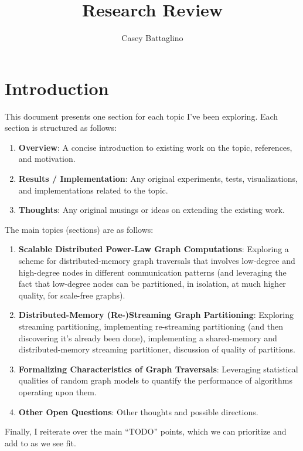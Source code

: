 \documentclass[11pt]{article}
\title{Research Review}
\author{Casey Battaglino}
\begin{document}
\maketitle


\section{Introduction}

This document presents one section for each topic I've been exploring. Each section is structured as follows:
\begin{enumerate}
\item \textbf{Overview}: A concise introduction to existing work on the topic, references, and motivation.
\item \textbf{Results / Implementation}: Any original experiments, tests, visualizations, and implementations related to the topic.
\item \textbf{Thoughts}: Any original musings or ideas on extending the existing work.
\end{enumerate}

The main topics (sections) are as follows:

\begin{enumerate}
\item \textbf{Scalable Distributed Power-Law Graph Computations}: Exploring a scheme for distributed-memory graph traversals that involves low-degree and high-degree nodes in different communication patterns (and leveraging the fact that low-degree nodes can be partitioned, in isolation, at much higher quality, for scale-free graphs). 
\item \textbf{Distributed-Memory (Re-)Streaming Graph Partitioning}: Exploring streaming partitioning, implementing re-streaming partitioning (and then discovering it's already been done), implementing a shared-memory and distributed-memory streaming partitioner, discussion of quality of partitions. 
\item \textbf{Formalizing Characteristics of Graph Traversals}: Leveraging statistical qualities of random graph models to quantify the performance of algorithms operating upon them. 
\item \textbf{Other Open Questions}: Other thoughts and possible directions.
\end{enumerate}

Finally, I reiterate over the main ``TODO'' points, which we can prioritize and add to as we see fit. 
\end{document}
